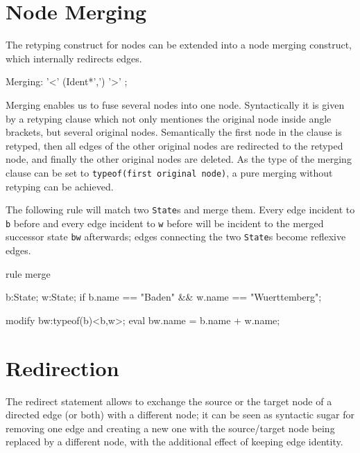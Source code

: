 \section{Node Merging} \label{sec:merge}
The retyping construct for nodes can be extended into a node merging construct,
which internally redirects edges.

\begin{rail}
  Merging: '<' (Ident*',') '>' ;
\end{rail}

Merging enables us to fuse several nodes into one node.
Syntactically it is given by a retyping clause which not only mentiones the original node inside angle brackets, but several original nodes.
Semantically the first node in the clause is retyped, then all edges of the other original nodes are redirected to the retyped node, and finally the other original nodes are deleted.
As the type of the merging clause can be set to \texttt{typeof(first original node)}, a pure merging without retyping can be achieved.

\begin{example}
The following rule will match two \texttt{State}s and merge them.
Every edge incident to \texttt{b} before and every edge incident to \texttt{w} before will be incident to the merged successor state \texttt{bw} afterwards; edges connecting the two \texttt{State}s become reflexive edges.
\begin{grgen}
rule merge {
  b:State;
  w:State;
  if { b.name == "Baden" && w.name == "Wuerttemberg"; }

  modify {
    bw:typeof(b)<b,w>;
    eval { bw.name = b.name + w.name; }
  }
}
\end{grgen}
\end{example}


\section{Redirection} \label{sec:redirect}

The redirect statement allows to exchange the source or the target node of a directed edge (or both) with a different node;
it can be seen as syntactic sugar for removing one edge and creating a new one with the source/target node being replaced by a different node, with the additional effect of keeping edge identity.

